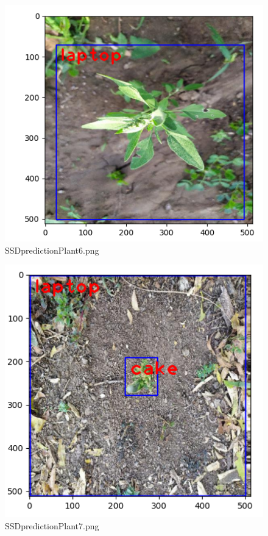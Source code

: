 \documentclass[12pt]{exam}
\begin{document}
\begin{questions}
\begin{parts}
		\hfill

		\begin{figure}[H]
			\includegraphics[width=\textwidth]{images-SSD/plant6.png}
			\caption{SSDpredictionPlant6.png}
		\end{figure}

		\hfill

		\begin{figure}[H]
			\includegraphics[width=\textwidth]{images-SSD/plant7.png}
			\caption{SSDpredictionPlant7.png}
		\end{figure}


\end{parts}
\end{questions}
\end{document}
